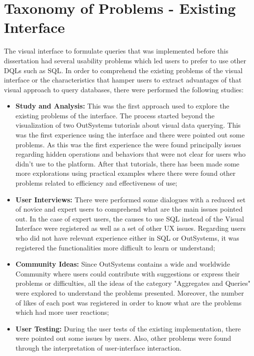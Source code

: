 \chapter{Taxonomy of Problems - Existing Interface}
\label{app:taxonomy_of_problems_existing_interface}

The visual interface to formulate queries that was implemented before this dissertation had several usability problems which led users to prefer to use other \glspl{DQL} such as SQL. In order to comprehend the existing problems of the visual interface or the characteristics that hamper users to extract advantages of that visual approach to query databases, there were performed the following studies:

\begin{itemize}
    \item \textbf{Study and Analysis:} This was the first approach used to explore the existing problems of the interface. The process started beyond the visualization of two OutSystems tutorials \cite{outsystems_tutorial_aggregates_101, outsystems_tutorial_advanced_aggregates} about visual data querying. This was the first experience using the interface and there were pointed out some problems. As this was the first experience the were found principally issues regarding hidden operations and behaviors that were not clear for users who didn't use to the platform. After that tutorials, there has been made some more explorations using practical examples where there were found other problems related to efficiency and effectiveness of use;
    \item \textbf{User Interviews:} There were performed some dialogues with a reduced set of novice and expert users to comprehend what are the main issues pointed out. In the case of expert users, the causes to use SQL instead of the Visual Interface were registered as well as a set of other \gls{UX} issues. Regarding users who did not have relevant experience either in SQL or OutSystems, it was registered the functionalities more difficult to learn or understand;
    \item \textbf{Community Ideas:} Since OutSystems contains a wide and worldwide Community where users could contribute with suggestions or express their problems or difficulties, all the ideas of the category "Aggregates and Queries" were explored to understand the problems presented. Moreover, the number of likes of each post was registered in order to know what are the problems which had more user reactions; 
    \item \textbf{User Testing:} During the user tests of the existing implementation, there were pointed out some issues by users. Also, other problems were found through the interpretation of user-interface interaction.
\end{itemize}

